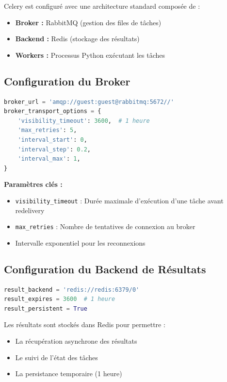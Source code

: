 \documentclass[12pt,a4paper]{article}
\begin{document}
Celery est configuré avec une architecture standard composée de :

\begin{itemize}
    \item \textbf{Broker :} RabbitMQ (gestion des files de tâches)
    \item \textbf{Backend :} Redis (stockage des résultats)
    \item \textbf{Workers :} Processus Python exécutant les tâches
\end{itemize}

\subsection{Configuration du Broker}

\begin{lstlisting}[language=Python]
broker_url = 'amqp://guest:guest@rabbitmq:5672//'
broker_transport_options = {
    'visibility_timeout': 3600,  # 1 heure
    'max_retries': 5,
    'interval_start': 0,
    'interval_step': 0.2,
    'interval_max': 1,
}
\end{lstlisting}

\textbf{Paramètres clés :}

\begin{itemize}
    \item \texttt{visibility\_timeout} : Durée maximale d'exécution d'une tâche avant redelivery
    \item \texttt{max\_retries} : Nombre de tentatives de connexion au broker
    \item Intervalle exponentiel pour les reconnexions
\end{itemize}

\subsection{Configuration du Backend de Résultats}

\begin{lstlisting}[language=Python]
result_backend = 'redis://redis:6379/0'
result_expires = 3600  # 1 heure
result_persistent = True
\end{lstlisting}

Les résultats sont stockés dans Redis pour permettre :
\begin{itemize}
    \item La récupération asynchrone des résultats
    \item Le suivi de l'état des tâches
    \item La persistance temporaire (1 heure)
\end{itemize}
\end{document}

